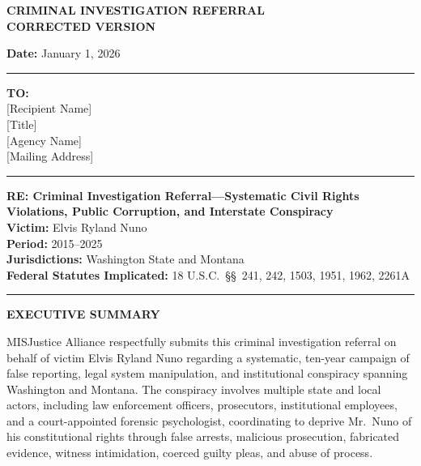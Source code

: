 \documentclass[11pt, letterpaper]{article}
\newcommand{\sectiontitle}[1]{\vspace{0.2in}\noindent\textcolor{NavyBlue}{\large\textbf{#1}}\vspace{0.1in}}
\begin{document}
\thispagestyle{firstpage}

\begin{center}
\textcolor{NavyBlue}{\LARGE\textbf{CRIMINAL INVESTIGATION REFERRAL}}\\[6pt]
\textcolor{NavyBlue}{\large\textbf{CORRECTED VERSION}}
\end{center}

\vspace{0.15in}

\noindent
\textbf{Date:} January 1, 2026

\vspace{0.1in}
\noindent\rule{\textwidth}{0.4pt}

\noindent
\textbf{TO:}\\
{[Recipient Name]}\\
{[Title]}\\
{[Agency Name]}\\
{[Mailing Address]}

\vspace{0.1in}
\noindent\rule{\textwidth}{0.4pt}

\noindent
\textbf{RE: Criminal Investigation Referral---Systematic Civil Rights Violations, Public Corruption, and Interstate Conspiracy}\\[6pt]
\textbf{Victim:} Elvis Ryland Nuno\\
\textbf{Period:} 2015--2025\\
\textbf{Jurisdictions:} Washington State and Montana\\
\textbf{Federal Statutes Implicated:} 18 U.S.C.\ \S\S\ 241, 242, 1503, 1951, 1962, 2261A

\vspace{0.1in}
\noindent\rule{\textwidth}{0.4pt}

\sectiontitle{EXECUTIVE SUMMARY}

MISJustice Alliance respectfully submits this criminal investigation referral on behalf of victim Elvis Ryland Nuno regarding a systematic, ten-year campaign of false reporting, legal system manipulation, and institutional conspiracy spanning Washington and Montana. The conspiracy involves multiple state and local actors, including law enforcement officers, prosecutors, institutional employees, and a court-appointed forensic psychologist, coordinating to deprive Mr.\ Nuno of his constitutional rights through false arrests, malicious prosecution, fabricated evidence, witness intimidation, coerced guilty pleas, and abuse of process.
\end{document}
